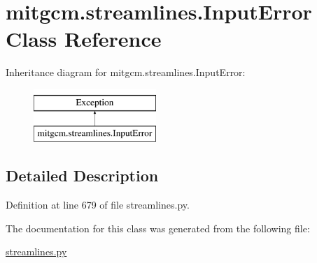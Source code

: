 \hypertarget{classmitgcm_1_1streamlines_1_1InputError}{\section{mitgcm.\+streamlines.\+Input\+Error Class Reference}
\label{classmitgcm_1_1streamlines_1_1InputError}
}
Inheritance diagram for mitgcm.\+streamlines.\+Input\+Error\+:\begin{figure}[H]
\begin{center}
\leavevmode
\includegraphics[height=2.000000cm]{classmitgcm_1_1streamlines_1_1InputError}
\end{center}
\end{figure}


\subsection{Detailed Description}


Definition at line 679 of file streamlines.\+py.



The documentation for this class was generated from the following file\+:\begin{DoxyCompactItemize}
\item 
\hyperlink{streamlines_8py}{streamlines.\+py}\end{DoxyCompactItemize}
